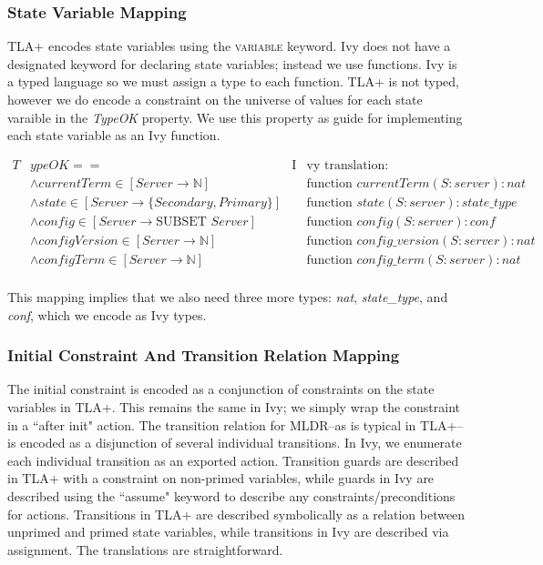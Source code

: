 \documentclass[12pt]{article}
\newcommand{\tla}[1]{{\small\scshape #1}}
\begin{document}
\subsubsection{State Variable Mapping}

TLA+ encodes state variables using the \tla{variable} keyword.  Ivy does not have a designated keyword for declaring state variables; instead we use functions.  Ivy is a typed language so we must assign a type to each function.  TLA+ is not typed, however we do encode a constraint on the universe of values for each state varaible in the \textit{TypeOK} property.  We use this property as guide for implementing each state variable as an Ivy function.

\begin{align*}
  T&ypeOK ==& \text{I}&\text{vy translation:}\\
    &\land currentTerm \in [Server \to \mathbb{N}]& &\text{function } currentTerm(S:server) : nat\\
    &\land state \in [Server \to \{Secondary, Primary\}]& &\text{function } state(S:server) : state\_type\\
    &\land config \in [Server \to \text{SUBSET } Server]& &\text{function } config(S:server) : conf\\
    &\land configVersion \in [Server \to \mathbb{N}]& &\text{function } config\_version(S:server) : nat\\
    &\land configTerm \in [Server \to \mathbb{N}]& &\text{function } config\_term(S:server) : nat\\
\end{align*}

This mapping implies that we also need three more types: \textit{nat}, \textit{state\_type}, and \textit{conf}, which we encode as Ivy types.

\subsubsection{Initial Constraint And Transition Relation Mapping}

The initial constraint is encoded as a conjunction of constraints on the state variables in TLA+.  This remains the same in Ivy; we simply wrap the constraint in a ``after init" action.  The transition relation for MLDR--as is typical in TLA+--is encoded as a disjunction of several individual transitions.  In Ivy, we enumerate each individual transition as an exported action.  Transition guards are described in TLA+ with a constraint on non-primed variables, while guards in Ivy are described using the ``assume" keyword to describe any constraints/preconditions for actions.  Transitions in TLA+ are described symbolically as a relation between unprimed and primed state variables, while transitions in Ivy are described via assignment.  The translations are straightforward.
\end{document}
